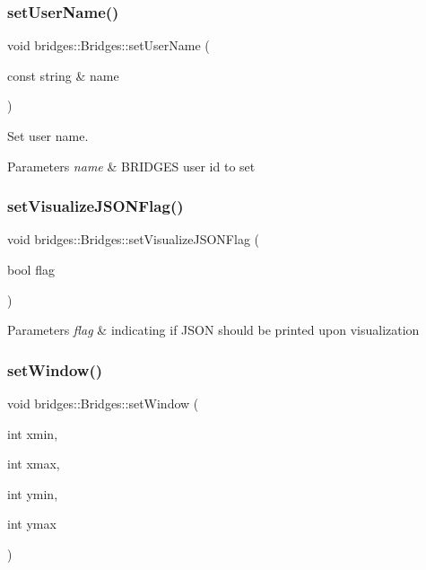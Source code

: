 \subsubsection{\texorpdfstring{set\+User\+Name()}{setUserName()}}
{\footnotesize\ttfamily void bridges\+::\+Bridges\+::set\+User\+Name (\begin{DoxyParamCaption}\item[{const string \&}]{name }\end{DoxyParamCaption})\hspace{0.3cm}{\ttfamily [inline]}}



Set user name. 


\begin{DoxyParams}{Parameters}
{\em name} & B\+R\+I\+D\+G\+ES user id to set \\
\hline
\end{DoxyParams}
\mbox{\label{classbridges_1_1_bridges_a69aca37ab2729d0345e0549d7baf0423}} 
\subsubsection{\texorpdfstring{set\+Visualize\+J\+S\+O\+N\+Flag()}{setVisualizeJSONFlag()}}
{\footnotesize\ttfamily void bridges\+::\+Bridges\+::set\+Visualize\+J\+S\+O\+N\+Flag (\begin{DoxyParamCaption}\item[{bool}]{flag }\end{DoxyParamCaption})\hspace{0.3cm}{\ttfamily [inline]}}


\begin{DoxyParams}{Parameters}
{\em flag} & indicating if J\+S\+ON should be printed upon visualization \\
\hline
\end{DoxyParams}
\mbox{\label{classbridges_1_1_bridges_a0465bca83056a72ba4db82b60e622163}} 
\subsubsection{\texorpdfstring{set\+Window()}{setWindow()}\hspace{0.1cm}{\footnotesize\ttfamily [1/2]}}
{\footnotesize\ttfamily void bridges\+::\+Bridges\+::set\+Window (\begin{DoxyParamCaption}\item[{int}]{xmin,  }\item[{int}]{xmax,  }\item[{int}]{ymin,  }\item[{int}]{ymax }\end{DoxyParamCaption})\hspace{0.3cm}{\ttfamily [inline]}}

